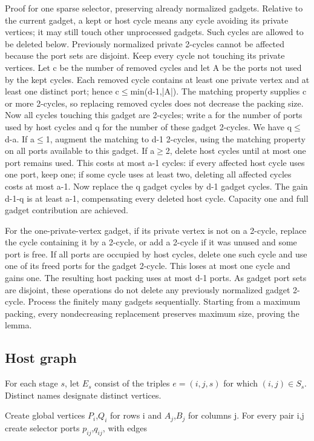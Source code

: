 \documentclass[11pt]{article}
\begin{document}
Proof for one sparse selector, preserving already normalized gadgets. Relative to the current gadget, a kept or host cycle means any cycle avoiding its private vertices; it may still touch other unprocessed gadgets. Such cycles are allowed to be deleted below. Previously normalized private 2-cycles cannot be affected because the port sets are disjoint. Keep every cycle not touching its private vertices. Let c be the number of removed cycles and let A be the ports not used by the kept cycles. Each removed cycle contains at least one private vertex and at least one distinct port; hence c\(\le\)min(d-1,|A|). The matching property supplies c or more 2-cycles, so replacing removed cycles does not decrease the packing size. Now all cycles touching this gadget are 2-cycles; write a for the number of ports used by host cycles and q for the number of these gadget 2-cycles. We have q\(\le\)d-a. If a\(\le\)1, augment the matching to d-1 2-cycles, using the matching property on all ports available to this gadget. If a\(\ge\)2, delete host cycles until at most one port remains used. This costs at most a-1 cycles: if every affected host cycle uses one port, keep one; if some cycle uses at least two, deleting all affected cycles costs at most a-1. Now replace the q gadget cycles by d-1 gadget cycles. The gain d-1-q is at least a-1, compensating every deleted host cycle. Capacity one and full gadget contribution are achieved.

For the one-private-vertex gadget, if its private vertex is not on a 2-cycle, replace the cycle containing it by a 2-cycle, or add a 2-cycle if it was unused and some port is free. If all ports are occupied by host cycles, delete one such cycle and use one of its freed ports for the gadget 2-cycle. This loses at most one cycle and gains one. The resulting host packing uses at most d-1 ports. As gadget port sets are disjoint, these operations do not delete any previously normalized gadget 2-cycle. Process the finitely many gadgets sequentially. Starting from a maximum packing, every nondecreasing replacement preserves maximum size, proving the lemma.

\subsection{Host graph}

For each stage $s$, let $E_s$ consist of the triples $e=(i,j,s)$ for which $(i,j)\in S_s$. Distinct names designate distinct vertices.

Create global vertices $P_i$,$Q_i$ for rows i and $A_j$,$B_j$ for columns j. For every pair i,j create selector ports $p_{ij}$,$q_{ij}$, with edges
\end{document}
